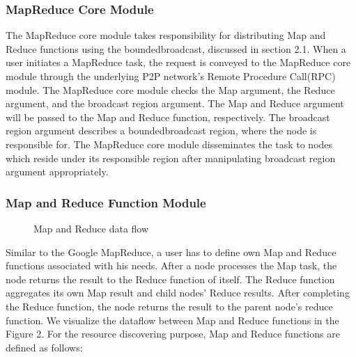 \documentclass{acm_proc_article-sp}
\begin{document}
\subsubsection{MapReduce Core Module}
The MapReduce core module takes responsibility for distributing Map and Reduce functions using the boundedbroadcast, discussed in section 2.1. 
When a user initiates a MapReduce task, the request is conveyed to the MapReduce core module through the underlying P2P network's Remote Procedure Call(RPC) module. 
The MapReduce core module checks the Map argument, the Reduce argument, and the broadcast region argument. 
The Map and Reduce argument will be passed to the Map and Reduce function, respectively. 
The broadcast region argument describes a boundedbroadcast region, where the node is responsible for. 
The MapReduce core module disseminates the task to nodes which reside under its responsible region after manipulating broadcast region argument appropriately.
\subsubsection{Map and Reduce Function Module}
\begin{figure}
\centering
{}
\caption{Map and Reduce data flow}
\end{figure}
Similar to the Google MapReduce, a user has to define own Map and Reduce functions associated with his needs. 
After a node processes the Map task, the node returns the result to the Reduce function of itself.
The Reduce function aggregates its own Map result and child nodes' Reduce results. 
After completing the Reduce function, the node returns the result to the parent node's reduce function.
We visualize the dataflow between Map and Reduce functions in the Figure 2.
For the resource discovering purpose, Map and Reduce functions are defined as follows:
\end{document}
